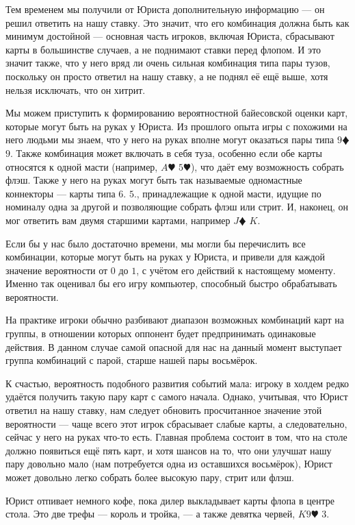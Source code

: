 \documentclass[12pt, a4paper, oneside]{extreport}
\theoremstyle{plain}              %
\theoremstyle{definition}         %
\begin{document}
Тем временем мы получили от Юриста дополнительную информацию --- он решил ответить на нашу ставку. Это значит, что его комбинация должна быть как минимум достойной --- основная часть игроков, включая Юриста, сбрасывают карты в большинстве случаев, а не поднимают ставки перед флопом. И это значит также, что у него вряд ли очень сильная комбинация типа пары тузов, поскольку он просто ответил на нашу ставку, а не поднял её ещё выше, хотя нельзя исключать, что он хитрит.

Мы можем приступить к формированию вероятностной байесовской оценки карт, которые могут быть на руках у Юриста. Из прошлого опыта игры с похожими на него людьми мы знаем, что у него на руках вполне могут оказаться пары типа  $9\vardiamond$  $9$\spadesuit. Также комбинация может включать в себя туза, особенно если обе карты относятся к одной масти (например, $A\varheart$  $5\varheart$), что даёт ему возможность собрать флэш. Также у него на руках могут быть так называемые одномастные коннекторы --- карты типа $6$\spadesuit.  $5$\spadesuit., принадлежащие к одной масти, идущие по номиналу одна за другой и позволяющие собрать флэш или стрит. И, наконец, он мог ответить вам двумя старшими картами, например $J \vardiamond$  $K$\spadesuit.

Если бы у нас было достаточно времени, мы могли бы перечислить все комбинации, которые могут быть на руках у Юриста, и привели для каждой значение вероятности от $0$ до $1$, с учётом его действий к настоящему моменту. Именно так оценивал бы его игру компьютер, способный быстро обрабатывать вероятности.

На практике игроки обычно разбивают диапазон возможных комбинаций карт на группы, в отношении которых оппонент будет предпринимать одинаковые действия. В данном случае самой опасной для нас на данный момент выступает группа комбинаций с парой, старше нашей пары восьмёрок.

К счастью, вероятность подобного развития событий мала: игроку в холдем редко удаётся получить такую пару карт с самого начала. Однако, учитывая, что Юрист ответил на нашу ставку, нам следует обновить просчитанное значение этой вероятности --- чаще всего этот игрок сбрасывает слабые карты, а следовательно, сейчас у него на руках что-то есть. Главная проблема состоит в том, что на столе должно появиться ещё пять карт, и хотя шансов на то, что они улучшат нашу пару довольно мало (нам потребуется одна из оставшихся восьмёрок), Юрист может довольно легко собрать более высокую пару, стрит или флэш.

Юрист отпивает немного кофе, пока дилер выкладывает карты флопа в центре стола. Это две трефы --- король и тройка, --- а также девятка червей,   $K$\clubsuit  $9\varheart$  $3$\clubsuit.
\end{document}
